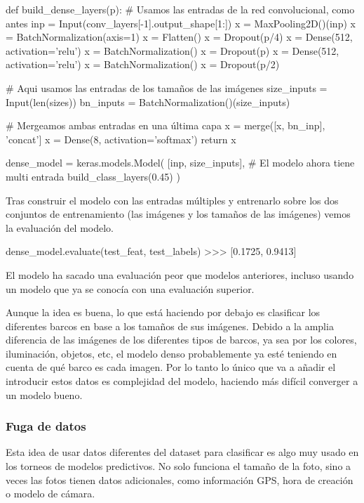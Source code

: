 \begin{python}
def build_dense_layers(p):
    # Usamos las entradas de la red convolucional, como antes
    inp = Input(conv_layers[-1].output_shape[1:])
    x = MaxPooling2D()(inp)
    x = BatchNormalization(axis=1)
    x = Flatten()
    x = Dropout(p/4)
    x = Dense(512, activation='relu')
    x = BatchNormalization()
    x = Dropout(p)
    x = Dense(512, activation='relu')
    x = BatchNormalization()
    x = Dropout(p/2)

    # Aqui usamos las entradas de los tamaños de las imágenes
    size_inputs = Input(len(sizes))
    bn_inputs = BatchNormalization()(size_inputs)

    # Mergeamos ambas entradas en una última capa
    x = merge([x, bn_inp], 'concat']
    x = Dense(8, activation='softmax')
    return x

dense_model = keras.models.Model(
    [inp, size_inputs],  # El modelo ahora tiene multi entrada
    build_class_layers(0.45)
)
\end{python}

Tras construir el modelo con las entradas múltiples y entrenarlo sobre los dos conjuntos de entrenamiento (las imágenes y los tamaños de las imágenes) vemos la evaluación del modelo.
\begin{python}
dense_model.evaluate(test_feat, test_labels)
>>> [0.1725, 0.9413]
\end{python}

El modelo ha sacado una evaluación peor que modelos anteriores, incluso usando un modelo que ya se conocía con una evaluación superior.

Aunque la idea es buena, lo que está haciendo por debajo es clasificar los diferentes barcos en base a los tamaños de sus imágenes. Debido a la amplia diferencia de las imágenes de los diferentes tipos de barcos, ya sea por los colores, iluminación, objetos, etc, el modelo denso probablemente ya esté teniendo en cuenta de qué barco es cada imagen. Por lo tanto lo único que va a añadir el introducir estos datos es complejidad del modelo, haciendo más difícil converger a un modelo bueno.

\subsubsection{Fuga de datos}

Esta idea de usar datos diferentes del dataset para clasificar es algo muy usado en los torneos de modelos predictivos. No solo funciona el tamaño de la foto, sino a veces las fotos tienen datos adicionales, como información GPS, hora de creación o modelo de cámara.

